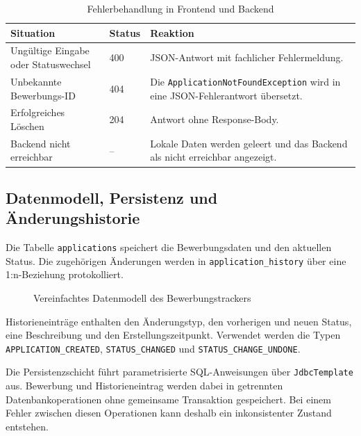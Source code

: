 \documentclass[a4paper,11pt]{article}
\begin{document}
\begin{table}[H]
\centering
\small
\begin{tabularx}{\textwidth}{L{3.5cm} L{2.2cm} Y}
\toprule
\textbf{Situation} & \textbf{Status} & \textbf{Reaktion} \\
\midrule

Ungültige Eingabe oder Statuswechsel &
400 &
JSON-Antwort mit fachlicher Fehlermeldung. \\

Unbekannte Bewerbungs-ID &
404 &
Die \texttt{ApplicationNotFoundException} wird in eine JSON-Fehlerantwort übersetzt. \\

Erfolgreiches Löschen &
204 &
Antwort ohne Response-Body. \\

Backend nicht erreichbar &
-- &
Lokale Daten werden geleert und das Backend als nicht erreichbar angezeigt. \\

\bottomrule
\end{tabularx}
\caption{Fehlerbehandlung in Frontend und Backend}
\label{tab:error-handling}
\end{table}


\newpage
\subsection{Datenmodell, Persistenz und Änderungshistorie}

Die Tabelle \texttt{applications} speichert die Bewerbungsdaten und den aktuellen Status.
Die zugehörigen Änderungen werden in \texttt{application\_history} über eine 1:n-Beziehung protokolliert.

\vspace{0.3cm}

\begin{figure}[H]
\centering
\resizebox{0.9\textwidth}{!}{
  
}
\caption{Vereinfachtes Datenmodell des Bewerbungstrackers}
\label{fig:data-model}
\end{figure}

Historieneinträge enthalten den Änderungstyp, den vorherigen und neuen Status, eine Beschreibung und den Erstellungszeitpunkt.
Verwendet werden die Typen \texttt{APPLICATION\_CREATED}, \texttt{STATUS\_CHANGED} und \texttt{STATUS\_CHANGE\_UNDONE}.

Die Persistenzschicht führt parametrisierte SQL-Anweisungen über \texttt{JdbcTemplate} aus.
Bewerbung und Historieneintrag werden dabei in getrennten Datenbankoperationen ohne gemeinsame Transaktion gespeichert.
Bei einem Fehler zwischen diesen Operationen kann deshalb ein inkonsistenter Zustand entstehen.
\end{document}
